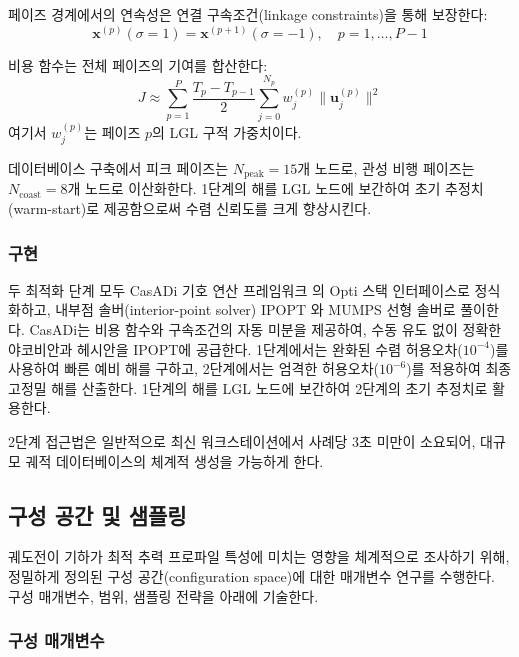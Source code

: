 \documentclass[a4paper,fleqn]{cas-dc}
\let\origsubsection\subsection
\renewcommand{\subsection}{\FloatBarrier\origsubsection}
\begin{document}
페이즈 경계에서의 연속성은 연결 구속조건(linkage constraints)을 통해 보장한다:
\begin{equation}
\mathbf{x}^{(p)}(\sigma = 1) = \mathbf{x}^{(p+1)}(\sigma = -1), \quad p = 1, \ldots, P-1
\end{equation}

비용 함수는 전체 페이즈의 기여를 합산한다:
\begin{equation}
J \approx \sum_{p=1}^{P} \frac{T_p - T_{p-1}}{2} \sum_{j=0}^{N_p} w_j^{(p)} \|\mathbf{u}_j^{(p)}\|^2
\end{equation}
여기서 $w_j^{(p)}$는 페이즈 $p$의 LGL 구적 가중치이다.

데이터베이스 구축에서 피크 페이즈는 $N_{\text{peak}} = 15$개 노드로, 관성 비행 페이즈는 $N_{\text{coast}} = 8$개 노드로 이산화한다. 1단계의 해를 LGL 노드에 보간하여 초기 추정치(warm-start)로 제공함으로써 수렴 신뢰도를 크게 향상시킨다.

\subsubsection{구현}

두 최적화 단계 모두 CasADi 기호 연산 프레임워크 \citep{Andersson2019}의 Opti 스택 인터페이스로 정식화하고, 내부점 솔버(interior-point solver) IPOPT \citep{Waechter2006}와 MUMPS 선형 솔버로 풀이한다. CasADi는 비용 함수와 구속조건의 자동 미분을 제공하여, 수동 유도 없이 정확한 야코비안과 헤시안을 IPOPT에 공급한다. 1단계에서는 완화된 수렴 허용오차($10^{-4}$)를 사용하여 빠른 예비 해를 구하고, 2단계에서는 엄격한 허용오차($10^{-6}$)를 적용하여 최종 고정밀 해를 산출한다. 1단계의 해를 LGL 노드에 보간하여 2단계의 초기 추정치로 활용한다.

2단계 접근법은 일반적으로 최신 워크스테이션에서 사례당 3초 미만이 소요되어, 대규모 궤적 데이터베이스의 체계적 생성을 가능하게 한다.

\subsection{구성 공간 및 샘플링}\label{subsec:configuration}

궤도전이 기하가 최적 추력 프로파일 특성에 미치는 영향을 체계적으로 조사하기 위해, 정밀하게 정의된 구성 공간(configuration space)에 대한 매개변수 연구를 수행한다. 구성 매개변수, 범위, 샘플링 전략을 아래에 기술한다.

\subsubsection{구성 매개변수}
\end{document}
